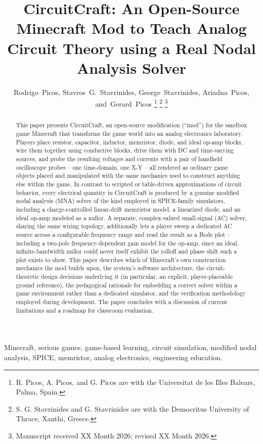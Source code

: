 \documentclass[journal]{IEEEtran}
\title{CircuitCraft: An Open-Source Minecraft Mod to Teach Analog Circuit Theory using a Real Nodal Analysis Solver}
\author{Rodrigo~Picos, Stavros~G.~Stavrinides, George~Stavrinides, Ariadna~Picos, and~Gerard~Picos%
\thanks{R. Picos, A. Picos, and G. Picos are with the Universitat de les Illes Balears, Palma, Spain.}%
\thanks{S. G. Stavrinides and G. Stavrinides are with the Democritus University of Thrace, Xanthi, Greece.}%
\thanks{Manuscript received XX Month 2026; revised XX Month 2026.}}
\begin{document}
\maketitle

\begin{abstract}
This paper presents CircuitCraft, an open-source modification (``mod'') for the sandbox
game Minecraft that transforms the game world into an analog electronics laboratory. Players
place resistor, capacitor, inductor, memristor, diode, and ideal op-amp blocks, wire them
together using conductive blocks, drive them with DC and time-varying sources, and probe the
resulting voltages and currents with a pair of handheld oscilloscope probes -- one
time-domain, one X-Y -- all rendered as ordinary game objects placed and manipulated with the
same mechanics used to construct anything else within the game. In contrast to scripted or
table-driven approximations of circuit behavior, every electrical quantity in CircuitCraft
is produced by a genuine modified nodal analysis (MNA) solver of the kind
employed in SPICE-family simulators, including a charge-controlled linear-drift memristor
model, a linearized diode, and an ideal op-amp modeled as a nullor. A separate, complex-valued
small-signal (AC) solver, sharing the same wiring topology, additionally lets a player sweep a
dedicated AC source across a configurable frequency range and read the result as a Bode plot --
including a two-pole frequency-dependent gain model for the op-amp, since an ideal, infinite-bandwidth
nullor could never itself exhibit the rolloff and phase shift such a plot exists to show. This
paper describes
which of Minecraft's own construction
mechanics the mod builds upon, the system's software architecture, the circuit-theoretic
design decisions underlying it (in particular, an explicit, player-placeable ground
reference), the pedagogical rationale for embedding a correct solver within a game
environment rather than a dedicated simulator, and the verification methodology employed
during development. The paper concludes with a discussion of current limitations and a
roadmap for classroom evaluation.
\end{abstract}

\begin{IEEEkeywords}
Minecraft, serious games, game-based learning, circuit simulation, modified nodal analysis,
SPICE, memristor, analog electronics, engineering education.
\end{IEEEkeywords}

\IEEEpeerreviewmaketitle



















\end{document}
